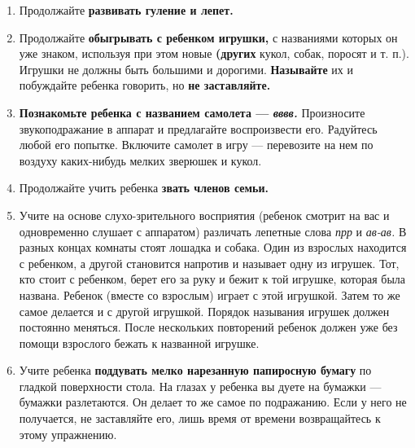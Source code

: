 \documentclass{book}
\renewcommand{\emph}[1]{\textit{#1}}
\begin{document}
\begin{enumerate}
\def\labelenumi{\arabic{enumi}.}
\item
  
  Продолжайте \textbf{развивать гуление и лепет.}
  
\item
  
  Продолжайте \textbf{обыгрывать с ребенком игрушки,} с названиями
  которых он уже знаком, используя при этом новые \textbf{(других}
  кукол, собак, поросят и т. п.). Игрушки не должны быть большими и
  дорогими. \textbf{Называйте} их и побуждайте ребенка говорить, но
  \textbf{не заставляйте.}
  
\item
  
  \textbf{Познакомьте ребенка с названием самолета --- \emph{вввв.
  }}Произносите звукоподражание в аппарат и предлагайте воспроизвести
  его. Радуйтесь любой его попытке. Включите самолет в игру ---
  перевозите на нем по воздуху каких-нибудь мелких зверюшек и кукол.
  
\item
  
  Продолжайте учить ребенка \textbf{звать членов семьи.}
  
\item
  
  Учите на основе слухо-зрительного восприятия (ребенок смотрит на вас и
  одновременно слушает с аппаратом) различать лепетные слова \emph{прр}
  и \emph{ав-ав.} В разных концах комнаты стоят лошадка и собака. Один
  из взрослых находится с ребенком, а другой становится напротив и
  называет одну из игрушек. Тот, кто стоит с ребенком, берет его за руку
  и бежит к той игрушке, которая была названа. Ребенок (вместе со
  взрослым) играет с этой игрушкой. Затем то же самое делается и с
  другой игрушкой. Порядок называния игрушек должен постоянно меняться.
  После нескольких повторений ребенок должен уже без помощи взрослого
  бежать к названной игрушке.
  
\item
  
  Учите ребенка \textbf{поддувать мелко нарезанную папиросную бумагу} по
  гладкой поверхности стола. На глазах у ребенка вы дуете на бумажки ---
  бумажки разлетаются. Он делает то же самое по подражанию. Если у него
  не получается, не заставляйте его, лишь время от времени возвращайтесь
  к этому упражнению.
  
\end{enumerate}
\end{document}
